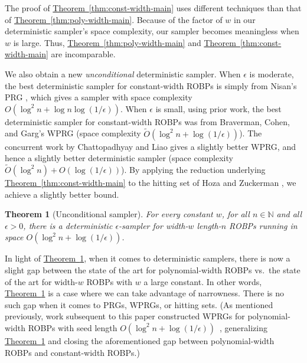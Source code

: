 \documentclass[11pt]{article}
\numberwithin{equation}{section}
\newtheorem{theorem}{Theorem}[section]
\theoremstyle{definition}
\theoremstyle{plain}
\newcommand{\N}{\mathbb N}
\newcommand{\expref}[2]{\hyperref[#2]{#1~\ref{#2}}}
\begin{document}
The proof of \expref{Theorem}{thm:const-width-main} uses different techniques than that of \expref{Theorem}{thm:poly-width-main}. Because of the factor of $w$ in our deterministic sampler's space complexity, our sampler becomes meaningless when $w$ is large. Thus, \expref{Theorem}{thm:poly-width-main} and \expref{Theorem}{thm:const-width-main} are incomparable.

We also obtain a new \emph{unconditional} deterministic sampler. When $\epsilon$ is moderate, the best deterministic sampler for constant-width ROBPs is simply from Nisan's PRG \cite{Nis92}, which gives a sampler with space complexity $O(\log^2 n + \log n \log(1/\epsilon))$. When $\epsilon$ is small, using prior work, the best deterministic sampler for constant-width ROBPs was from Braverman, Cohen, and Garg's WPRG \cite{BCG20} (space complexity $\widetilde{O}(\log^2 n + \log(1/\epsilon))$). The concurrent work by Chattopadhyay and Liao \cite{CL20} gives a slightly better WPRG, and hence a slightly better deterministic sampler (space complexity $\widetilde{O}(\log^2 n) + O(\log(1/\epsilon))$). By applying the reduction underlying \expref{Theorem}{thm:const-width-main} to the hitting set of Hoza and Zuckerman \cite{HZ20}, we achieve a slightly better bound.

\begin{theorem}[Unconditional sampler] \label{thm:hz-sampler}
For every constant $w$, for all $n \in \N$ and all $\epsilon > 0$, there is a deterministic $\epsilon$-sampler for width-$w$ length-$n$ ROBPs running in space $O(\log^2 n + \log(1/\epsilon))$.
\end{theorem}

In light of \expref{Theorem}{thm:hz-sampler}, when it comes to deterministic samplers, there is now a slight gap between the state of the art for polynomial-width ROBPs vs.\ the state of the art for width-$w$ ROBPs with $w$ a large constant. In other words, \expref{Theorem}{thm:hz-sampler} is a case where we can take advantage of narrowness. There is no such gap when it comes to PRGs, WPRGs, or hitting sets. (As mentioned previously, work subsequent to this paper constructed WPRGs for polynomial-width ROBPs with seed length $O(\log^2 n + \log(1/\epsilon))$~\cite{CDRSTS21,PV21,Hoz21}, generalizing \expref{Theorem}{thm:hz-sampler} and closing the aforementioned gap between polynomial-width ROBPs and constant-width ROBPs.)
\end{document}
